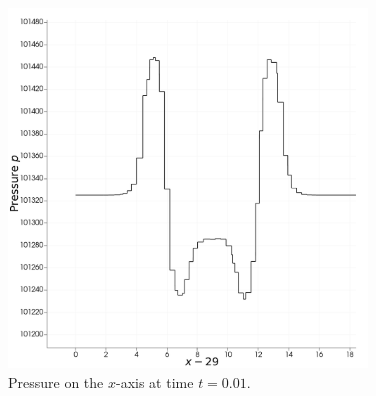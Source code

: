 \begin{figure}[p]
\centering
\includegraphics[width=0.85\textwidth]{ellipseP001.png}
\caption{Pressure on the $x$-axis at time $t = 0.01$.}
\label{fig:ellipse-P001}
\end{figure}









































